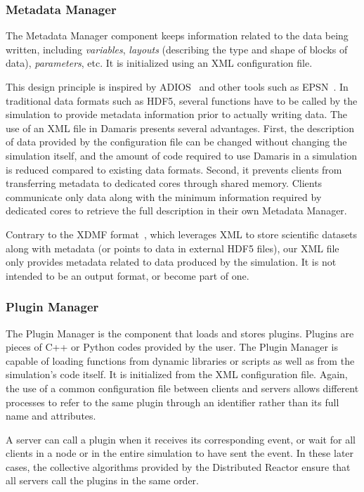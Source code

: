 \subsubsection{Metadata Manager}

The Metadata Manager component keeps information related to the data
being written, including \emph{variables}, \emph{layouts} (describing the type and shape of
blocks of data), \emph{parameters}, etc. It is initialized using an XML configuration file.

This design principle is inspired by ADIOS~\cite{lofstead2008flexible} 
and other tools such as EPSN~\cite{esnard2006steering}.
In traditional data formats such as HDF5, several functions have to be called by the
simulation to provide metadata information prior to actually writing data.
The use of an XML file in Damaris presents several advantages.
First, the description of data provided by the configuration file can be changed without 
changing the simulation itself, and the amount of code required to use Damaris in a simulation
is reduced compared to existing data formats.
Second, it prevents clients from transferring metadata to dedicated cores through shared memory. 
Clients communicate only data along with the minimum information
required by dedicated cores to retrieve the full description in their own Metadata Manager.

Contrary to the XDMF format~\cite{xdmf}, which leverages XML to store scientific datasets
along with metadata (or points to data in external HDF5 files), our XML file only provides metadata related to
data produced by the simulation. It is not intended to be an output format, or become part of one.

\subsubsection{Plugin Manager}

The Plugin Manager is the component that loads and stores plugins.
Plugins are pieces of C++ or Python codes provided by the user. The Plugin Manager is capable of
loading functions from dynamic libraries or scripts as well as from the simulation's code itself. 
It is initialized from the XML configuration file. Again, the use of a common
configuration file between clients and servers allows different processes
to refer to the same plugin through an identifier rather than its full name and attributes.

A server can call a plugin when it receives its corresponding event, or
wait for all clients in a node or in the entire simulation to have sent the event. 
In these later cases, the collective algorithms provided by the Distributed Reactor ensure that
all servers call the plugins in the same order.


